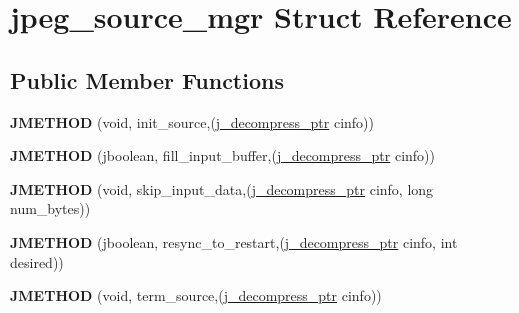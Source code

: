 \hypertarget{structjpeg__source__mgr}{}\section{jpeg\+\_\+source\+\_\+mgr Struct Reference}
\label{structjpeg__source__mgr}
\subsection*{Public Member Functions}
\begin{DoxyCompactItemize}
\item 
{\bfseries J\+M\+E\+T\+H\+OD} (void, init\+\_\+source,(\hyperlink{structjpeg__decompress__struct}{j\+\_\+decompress\+\_\+ptr} cinfo))\hypertarget{structjpeg__source__mgr_af8fda02c19c9dc4e505daabb77c3ad81}{}\label{structjpeg__source__mgr_af8fda02c19c9dc4e505daabb77c3ad81}

\item 
{\bfseries J\+M\+E\+T\+H\+OD} (jboolean, fill\+\_\+input\+\_\+buffer,(\hyperlink{structjpeg__decompress__struct}{j\+\_\+decompress\+\_\+ptr} cinfo))\hypertarget{structjpeg__source__mgr_a2f082c547b66ca616db2828c455544ad}{}\label{structjpeg__source__mgr_a2f082c547b66ca616db2828c455544ad}

\item 
{\bfseries J\+M\+E\+T\+H\+OD} (void, skip\+\_\+input\+\_\+data,(\hyperlink{structjpeg__decompress__struct}{j\+\_\+decompress\+\_\+ptr} cinfo, long num\+\_\+bytes))\hypertarget{structjpeg__source__mgr_a3e29df8ddadb0c15e54b69b5a7a10305}{}\label{structjpeg__source__mgr_a3e29df8ddadb0c15e54b69b5a7a10305}

\item 
{\bfseries J\+M\+E\+T\+H\+OD} (jboolean, resync\+\_\+to\+\_\+restart,(\hyperlink{structjpeg__decompress__struct}{j\+\_\+decompress\+\_\+ptr} cinfo, int desired))\hypertarget{structjpeg__source__mgr_a14a590515d6af266a4f9976bc355bec0}{}\label{structjpeg__source__mgr_a14a590515d6af266a4f9976bc355bec0}

\item 
{\bfseries J\+M\+E\+T\+H\+OD} (void, term\+\_\+source,(\hyperlink{structjpeg__decompress__struct}{j\+\_\+decompress\+\_\+ptr} cinfo))\hypertarget{structjpeg__source__mgr_a6c0683ce1166b9ee659b2d3aa1efb1c2}{}\label{structjpeg__source__mgr_a6c0683ce1166b9ee659b2d3aa1efb1c2}

\end{DoxyCompactItemize}
